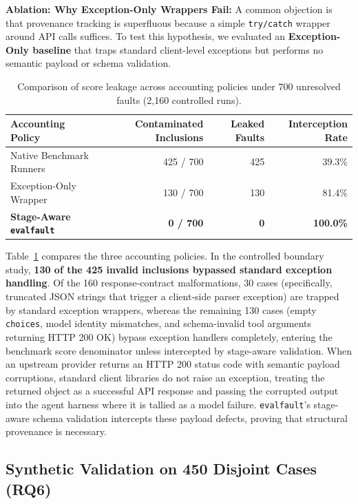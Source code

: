 \textbf{Ablation: Why Exception-Only Wrappers Fail:}
A common objection is that provenance tracking is superfluous because a simple \texttt{try/catch} wrapper around API calls suffices. To test this hypothesis, we evaluated an \textbf{Exception-Only baseline} that traps standard client-level exceptions but performs no semantic payload or schema validation.

\begin{table}[!t]
\centering
\caption{Comparison of score leakage across accounting policies under 700 unresolved faults (2,160 controlled runs).}
\label{tab:exception-ablation}
\footnotesize
\begin{tabular}{@{}lrrr@{}}
\toprule
Accounting Policy & Contaminated Inclusions & Leaked Faults & Interception Rate \\
\midrule
Native Benchmark Runners & 425 / 700 & 425 & 39.3\% \\
Exception-Only Wrapper & 130 / 700 & 130 & 81.4\% \\
\textbf{Stage-Aware \texttt{evalfault}} & \textbf{0 / 700} & \textbf{0} & \textbf{100.0\%} \\
\bottomrule
\end{tabular}
\end{table}

Table~\ref{tab:exception-ablation} compares the three accounting policies. In the controlled boundary study, \textbf{130 of the 425 invalid inclusions bypassed standard exception handling}. Of the 160 response-contract malformations, 30 cases (specifically, truncated JSON strings that trigger a client-side parser exception) are trapped by standard exception wrappers, whereas the remaining 130 cases (empty \texttt{choices}, model identity mismatches, and schema-invalid tool arguments returning HTTP 200 OK) bypass exception handlers completely, entering the benchmark score denominator unless intercepted by stage-aware validation. When an upstream provider returns an HTTP 200 status code with semantic payload corruptions, standard client libraries do not raise an exception, treating the returned object as a successful API response and passing the corrupted output into the agent harness where it is tallied as a model failure. \texttt{evalfault}'s stage-aware schema validation intercepts these payload defects, proving that structural provenance is necessary.

\subsection{Synthetic Validation on 450 Disjoint Cases (RQ6)}

